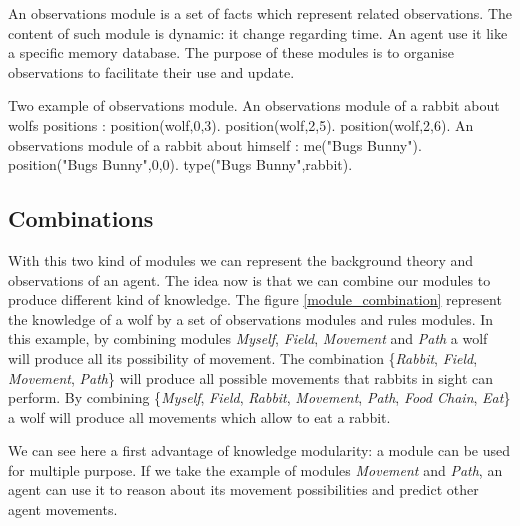 \documentclass{aamas2012}
\begin{document}
	\begin{definition}
		An observations module is a set of facts which represent related observations.
		The content of such module is dynamic: it change regarding time.
		An agent use it like a specific memory database.
		The purpose of these modules is to organise observations to facilitate their use and update.
	\end{definition}
	
	\begin{example}
		Two example of observations module.
		\newline
		An observations module of a rabbit about wolfs positions :\newline
		\newline
		position(wolf,0,3).\newline
		position(wolf,2,5).\newline
		position(wolf,2,6).\newline
		\newline
		An observations module of a rabbit about himself : \newline
		\newline
		me("Bugs Bunny").\newline
		position("Bugs Bunny",0,0).\newline
		type("Bugs Bunny",rabbit).\newline
	\end{example}
	
\subsection{Combinations}

	With this two kind of modules we can represent the background theory and observations of an agent.
	The idea now is that we can combine our modules to produce different kind of knowledge.
	The figure \ref{module_combination} represent the knowledge of a wolf by a set of observations modules and rules modules.
	In this example, by combining modules \emph{Myself}, \emph{Field}, \emph{Movement} and \emph{Path} 
	a wolf will produce all its possibility of movement.
	The combination \{\emph{Rabbit}, \emph{Field}, \emph{Movement}, \emph{Path}\} will produce all possible movements that rabbits in sight can perform. 
	By combining \{\emph{Myself}, \emph{Field}, \emph{Rabbit}, \emph{Movement}, \emph{Path}, \emph{Food Chain}, \emph{Eat}\} a wolf will produce
	all movements which allow to eat a rabbit.
	
	We can see here a first advantage of knowledge modularity: a module can be used for multiple purpose.
	If we take the example of modules \emph{Movement} and \emph{Path}, an agent can use it to reason about its movement possibilities and predict other agent movements.
\end{document}
